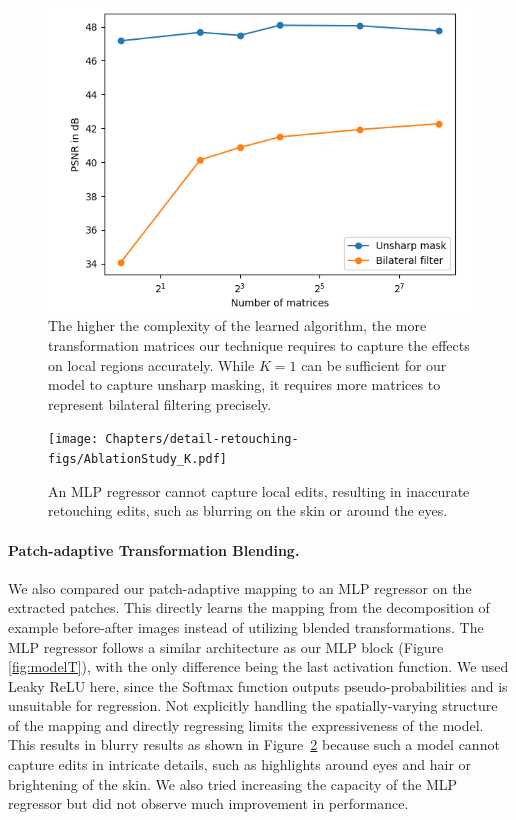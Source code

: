 \begin{figure}[th] %
    \centering
	\includegraphics[width=0.7\columnwidth]{Chapters/detail-retouching-figs/ablation_matrices_new.png}

    \caption{The higher the complexity of the learned algorithm, the more transformation matrices our technique requires to capture the effects on local regions accurately. While $K=1$ can be sufficient for our model to capture unsharp masking, it requires more matrices to represent bilateral filtering precisely.}

    \label{fig:ablation_K}
\end{figure}

\begin{figure}%
\centering
\texttt{[image: Chapters/detail-retouching-figs/AblationStudy\_K.pdf]}
    \caption{An MLP regressor cannot capture local edits, resulting in inaccurate retouching edits, such as blurring on the skin or around the eyes.}

\label{fig:ablation_MLP}
\end{figure}
\paragraph{Patch-adaptive Transformation Blending.} We also compared our patch-adaptive mapping to an MLP regressor on the extracted patches. This directly learns the mapping from the decomposition of example before-after images instead of utilizing blended transformations. The MLP regressor follows a similar architecture as our MLP block (Figure \ref{fig:modelT}), with the only difference being the last activation function. We used Leaky ReLU here, since the Softmax function outputs pseudo-probabilities and is unsuitable for regression. Not explicitly handling the spatially-varying structure of the mapping and directly regressing limits the expressiveness of the model. This results in blurry results as shown in Figure~\ref{fig:ablation_MLP} because such a model cannot capture edits in intricate details, such as highlights around eyes and hair or brightening of the skin. We also tried increasing the capacity of the MLP regressor but did not observe much improvement in performance.



